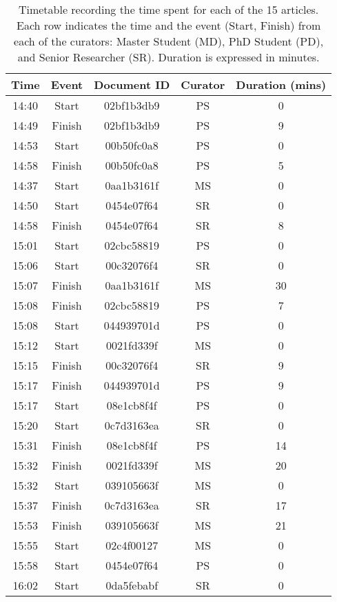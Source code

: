 \begin{table}[ht]
\centering
\small
\caption{Timetable recording the time spent for each of the 15 articles. Each row indicates the time and the event (Start, Finish) from each of the curators: Master Student (MD), PhD Student (PD), and Senior Researcher (SR). Duration is expressed in minutes.}
\label{tab:timetable-details}
\begin{tabular}{cc|cc|c}
Time & Event & Document ID & Curator & Duration (mins) \\
\toprule
14:40 & Start   & 02bf1b3db9 & PS  & 0  \\
14:49 & Finish  & 02bf1b3db9 & PS  & 9  \\
14:53 & Start   & 00b50fc0a8 & PS  & 0  \\
14:58 & Finish  & 00b50fc0a8 & PS  & 5  \\
14:37 & Start   & 0aa1b3161f & MS  & 0  \\
14:50 & Start   & 0454e07f64 & SR  & 0  \\
14:58 & Finish  & 0454e07f64 & SR  & 8  \\
15:01 & Start   & 02cbc58819 & PS  & 0  \\
15:06 & Start   & 00c32076f4 & SR  & 0  \\
15:07 & Finish  & 0aa1b3161f & MS  & 30 \\
15:08 & Finish  & 02cbc58819 & PS  & 7  \\
15:08 & Start   & 044939701d & PS  & 0  \\
15:12 & Start   & 0021fd339f & MS  & 0  \\
15:15 & Finish  & 00c32076f4 & SR  & 9  \\
15:17 & Finish  & 044939701d & PS  & 9  \\
15:17 & Start   & 08e1cb8f4f & PS  & 0  \\
15:20 & Start   & 0c7d3163ea & SR  & 0  \\
15:31 & Finish  & 08e1cb8f4f & PS  & 14 \\
15:32 & Finish  & 0021fd339f & MS  & 20 \\
15:32 & Start   & 039105663f & MS  & 0  \\
15:37 & Finish  & 0c7d3163ea & SR  & 17 \\
15:53 & Finish  & 039105663f & MS  & 21 \\
15:55 & Start   & 02c4f00127 & MS  & 0  \\
15:58 & Start   & 0454e07f64 & PS  & 0  \\
16:02 & Start   & 0da5febabf & SR  & 0  \\

\end{tabular}
\end{table}
